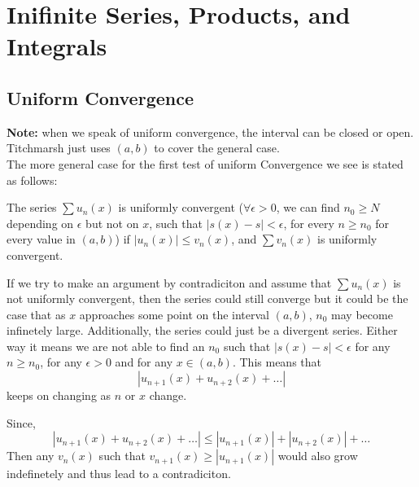\section{Inifinite Series, Products, and Integrals}

\subsection{Uniform Convergence}

\textbf{Note:} when we speak of uniform convergence, the interval can be closed or open.
Titchmarsh just uses $(a,b)$ to cover the general case.
\\

The more general case for the first test of uniform Convergence we see is stated as follows:

The series $\sum u_n(x)$ is uniformly convergent
($\forall \epsilon>0$, we can find $n_0 \geq N$ depending on $\epsilon$ but not on $x$,
such that $|s(x) - s|<\epsilon$, for every $n\geq n_0$ for every value in $(a,b)$)
if $|u_n(x)| \leq v_n(x)$, and $\sum v_n(x)$ is uniformly convergent.

If we try to make an argument by contradiciton and assume that $\sum u_n(x)$ is not
uniformly convergent, then the series could still converge but it could be the case that
as $x$ approaches some point on the interval $(a,b)$, $n_0$ may become infinetely large.
Additionally, the series could just be a divergent series.
Either way it means we are not able to find an $n_0$ such that $|s(x) - s| < \epsilon$
for any $n \geq n_0$, for any $\epsilon >0$ and for any $x\in (a,b)$.
This means that
$$
|u_{n+1}(x) + u_{n+2}(x) + \ldots |
$$
keeps on changing as $n$ or $x$ change.

Since,
$$
|u_{n+1}(x) + u_{n+2}(x) + \ldots | \leq |u_{n+1}(x)| + |u_{n+2}(x)| + \ldots
$$
Then any $v_n(x)$ such that $v_{n+1}(x) \geq |u_{n+1}(x)|$ would also grow indefinetely and thus
lead to a contradiciton.
\\~\\